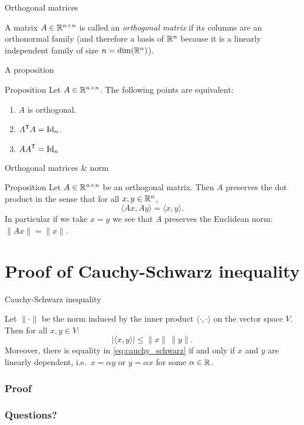 \documentclass{beamer}
\begin{document}
\begin{frame}[t]{Orthogonal matrices}
	\grid

	\begin{definition}
		A matrix $A \in \mathbb{R}^{n \times n}$ is called an \emph{orthogonal matrix} if its columns are an orthonormal family (and therefore a basis of $\mathbb{R}^n$ because it is a linearly independent family of size $n = {{\rm dim}}(\mathbb{R}^n)$).
	\end{definition}
\end{frame}

\begin{frame}[t]{A proposition}
	\grid

	\vspace{-0.4cm}
	\begin{block}{Proposition}
		Let $A \in \mathbb{R}^{n \times n}$. The following points are equivalent:
		\begin{enumerate}
			\item $A$ is orthogonal.
			\item $A^{{\sf T}} A = {{\rm Id}}_n$.
			\item $A A^{{\sf T}} = {{\rm Id}}_n$
		\end{enumerate}
	\end{block}
\end{frame}

\begin{frame}[t]{Orthogonal matrices \& norm}
	\grid

	\vspace{-0.4cm}
	\begin{block}{Proposition}
	Let $A \in \mathbb{R}^{n \times n}$ be an orthogonal matrix. Then $A$ preserves the dot product in the sense that for all $x,y \in \mathbb{R}^n$,
	$$
	\langle Ax, Ay \rangle = \langle x,y\rangle.
	$$
	In particular if we take $x=y$ we see that $A$ preserves the Euclidean norm: $\|Ax\| = \|x\|$.
\end{block}
\end{frame}

\section{Proof of Cauchy-Schwarz inequality}
\begin{frame}[t]{Cauchy-Schwarz inequality}
	\grid

	\vspace{-0.4cm}
\begin{theorem}
	Let $\| \cdot \|$ be the norm induced by the inner product $\langle \cdot , \cdot \rangle$ on the vector space $V$. Then for all $x,y \in V$:
	\begin{equation}\label{eq:cauchy_schwarz}
	| \langle x,y \rangle | \leq \|x\| \, \|y\|.
	\end{equation}
	Moreover, there is equality in \eqref{eq:cauchy_schwarz} if and only if $x$ and $y$ are linearly dependent, i.e.\ $x = \alpha y$ or $y = \alpha x$ for some $\alpha \in \mathbb{R}$.
\end{theorem}
\end{frame}
\begin{frame}[t]
	\frametitle{Proof}
	\grid

	\pause
	\pause
\end{frame}

\appendix
\backupbegin
\begin{frame}[t]
	\frametitle{Questions?}
	\grid

	\pause
	\pause
\end{frame}
\backupend
\end{document}
